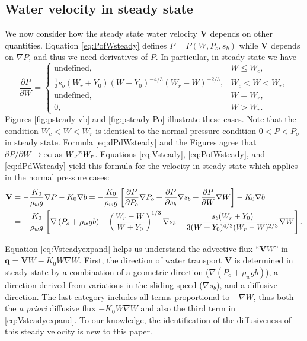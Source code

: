 \documentclass[11pt,final]{amsart}%
\newcommand\bV{\mathbf{V}}
\newcommand\bq{\mathbf{q}}
\newcommand{\grad}{\nabla}
\begin{document}
\subsection*{Water velocity in steady state}  We now consider how the steady state water velocity $\bV$ depends on other quantities.  Equation \eqref{eq:PofWsteady} defines $P=P(W,P_o,s_b)$ while $\bV$ depends on $\grad P$, and thus we need derivatives of $P$.  In particular, in steady state we have
\begin{equation}
\frac{\partial P}{\partial W} =
    \begin{cases}
      \text{undefined}, & W \le W_c, \\
      \frac{1}{3} s_b (W_r + Y_0) (W+Y_0)^{-4/3} (W_r - W)^{-2/3}, & W_c < W < W_r, \\
      \text{undefined}, & W = W_r, \\
      0, & W > W_r.
    \end{cases}  \label{eq:dPdWsteady}
\end{equation}
Figures \ref{fig:psteady-vb} and \ref{fig:psteady-Po} illustrate these cases.  Note that the condition $W_c < W < W_r$ is identical to the normal pressure condition $0 < P < P_o$ in steady state.  Formula \eqref{eq:dPdWsteady} and the Figures agree that $\partial P / \partial W \to \infty$ as $W \!\!\nearrow\! W_r$.  Equations \eqref{eq:Vsteady}, \eqref{eq:PofWsteady}, and \eqref{eq:dPdWsteady} yield this formula for the velocity in steady state which applies in the normal pressure cases:
\begin{align}
\bV &= - \frac{K_0}{\rho_w g} \grad P - K_0 \grad b = - \frac{K_0}{\rho_w g} \left[\frac{\partial P}{\partial P_o} \grad P_o + \frac{\partial P}{\partial s_b} \grad s_b + \frac{\partial P}{\partial W} \grad W\right] - K_0 \grad b  \notag \\
    &= - \frac{K_0}{\rho_w g} \left[\grad \left(P_o + \rho_w g b\right) - \left(\frac{W_r - W}{W+Y_0}\right)^{1/3} \grad s_b + \frac{s_b (W_r + Y_0)}{3  (W+Y_0)^{4/3} (W_r - W)^{2/3}} \grad W\right]. \label{eq:Vsteadyexpand}
\end{align}

Equation \eqref{eq:Vsteadyexpand} helps us understand the advective flux ``$\bV W$'' in $\bq=\bV W - K_0 W \grad W$.  First, the direction of water transport $\bV$ is determined in steady state by a combination of a geometric direction ($\grad \left(P_o + \rho_w g b\right)$), a direction derived from variations in the sliding speed ($\grad s_b$), and a diffusive direction.  The last category includes all terms proportional to $-\grad W$, thus both the \emph{a priori} diffusive flux $-K_0 W \grad W$ and also the third term in \eqref{eq:Vsteadyexpand}.  To our knowledge, the identification of the diffusiveness of this steady velocity is new to this paper.
\end{document}
